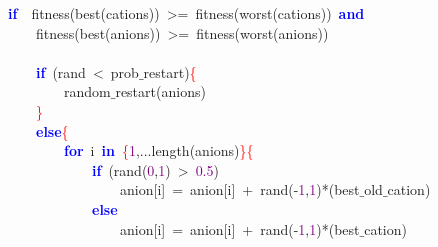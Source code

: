 \noindent
\mbox{}\textbf{\textcolor{Blue}{if}}\ \ fitness\textcolor{BrickRed}{(}best\textcolor{BrickRed}{(}cations\textcolor{BrickRed}{))}\ \textcolor{BrickRed}{\textgreater{}=}\ fitness\textcolor{BrickRed}{(}worst\textcolor{BrickRed}{(}cations\textcolor{BrickRed}{))}\ \textbf{\textcolor{Blue}{and}} \\
\mbox{}\ \ \ \ fitness\textcolor{BrickRed}{(}best\textcolor{BrickRed}{(}anions\textcolor{BrickRed}{))}\ \textcolor{BrickRed}{\textgreater{}=}\ fitness\textcolor{BrickRed}{(}worst\textcolor{BrickRed}{(}anions\textcolor{BrickRed}{))} \\
\mbox{} \\
\mbox{}\ \ \ \ \textbf{\textcolor{Blue}{if}}\ \textcolor{BrickRed}{(}rand\ \textcolor{BrickRed}{\textless{}}\ prob$\_$restart\textcolor{BrickRed}{)}\textcolor{Red}{\{} \\
\mbox{}\ \ \ \ \ \ \ \ random$\_$restart\textcolor{BrickRed}{(}anions\textcolor{BrickRed}{)} \\
\mbox{}\ \ \ \ \textcolor{Red}{\}} \\
\mbox{}\ \ \ \ \textbf{\textcolor{Blue}{else}}\textcolor{Red}{\{} \\
\mbox{}\ \ \ \ \ \ \ \ \textbf{\textcolor{Blue}{for}}\ i\ \textbf{\textcolor{Blue}{in}}\ \textcolor{Red}{\{}\textcolor{Purple}{1}\textcolor{BrickRed}{,...}length\textcolor{BrickRed}{(}anions\textcolor{BrickRed}{)}\textcolor{Red}{\}\{} \\
\mbox{}\ \ \ \ \ \ \ \ \ \ \ \ \textbf{\textcolor{Blue}{if}}\ \textcolor{BrickRed}{(}rand\textcolor{BrickRed}{(}\textcolor{Purple}{0}\textcolor{BrickRed}{,}\textcolor{Purple}{1}\textcolor{BrickRed}{)}\ \textcolor{BrickRed}{\textgreater{}}\ \textcolor{Purple}{0.5}\textcolor{BrickRed}{)} \\
\mbox{}\ \ \ \ \ \ \ \ \ \ \ \ \ \ \ \ anion\textcolor{BrickRed}{[}i\textcolor{BrickRed}{]}\ \textcolor{BrickRed}{=}\ anion\textcolor{BrickRed}{[}i\textcolor{BrickRed}{]}\ \textcolor{BrickRed}{+}\ rand\textcolor{BrickRed}{(-}\textcolor{Purple}{1}\textcolor{BrickRed}{,}\textcolor{Purple}{1}\textcolor{BrickRed}{)*(}best$\_$old$\_$cation\textcolor{BrickRed}{)} \\
\mbox{}\ \ \ \ \ \ \ \ \ \ \ \ \textbf{\textcolor{Blue}{else}} \\
\mbox{}\ \ \ \ \ \ \ \ \ \ \ \ \ \ \ \ anion\textcolor{BrickRed}{[}i\textcolor{BrickRed}{]}\ \textcolor{BrickRed}{=}\ anion\textcolor{BrickRed}{[}i\textcolor{BrickRed}{]}\ \textcolor{BrickRed}{+}\ rand\textcolor{BrickRed}{(-}\textcolor{Purple}{1}\textcolor{BrickRed}{,}\textcolor{Purple}{1}\textcolor{BrickRed}{)*(}best$\_$cation\textcolor{BrickRed}{)} \\
